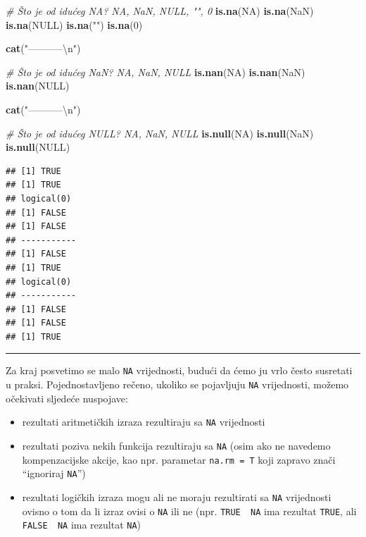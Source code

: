 \documentclass[]{book}
\newenvironment{Shaded}{\begin{snugshade}}{\end{snugshade}}
\newcommand{\KeywordTok}[1]{\textcolor[rgb]{0.13,0.29,0.53}{\textbf{#1}}}
\newcommand{\DecValTok}[1]{\textcolor[rgb]{0.00,0.00,0.81}{#1}}
\newcommand{\CharTok}[1]{\textcolor[rgb]{0.31,0.60,0.02}{#1}}
\newcommand{\StringTok}[1]{\textcolor[rgb]{0.31,0.60,0.02}{#1}}
\newcommand{\CommentTok}[1]{\textcolor[rgb]{0.56,0.35,0.01}{\textit{#1}}}
\newcommand{\OtherTok}[1]{\textcolor[rgb]{0.56,0.35,0.01}{#1}}
\newcommand{\NormalTok}[1]{#1}
\providecommand{\tightlist}{%
  \setlength{\itemsep}{0pt}\setlength{\parskip}{0pt}}
\theoremstyle{definition}
\theoremstyle{definition}
\theoremstyle{definition}
\theoremstyle{remark}
\begin{document}
\begin{Shaded}
\begin{Highlighting}[]
\CommentTok{# Što je od idućeg NA?      NA, NaN, NULL, "", 0}
\KeywordTok{is.na}\NormalTok{(}\OtherTok{NA}\NormalTok{)}
\KeywordTok{is.na}\NormalTok{(}\OtherTok{NaN}\NormalTok{)}
\KeywordTok{is.na}\NormalTok{(}\OtherTok{NULL}\NormalTok{)}
\KeywordTok{is.na}\NormalTok{(}\StringTok{""}\NormalTok{)}
\KeywordTok{is.na}\NormalTok{(}\DecValTok{0}\NormalTok{)}

\KeywordTok{cat}\NormalTok{(}\StringTok{"-----------}\CharTok{\textbackslash{}n}\StringTok{"}\NormalTok{)}

\CommentTok{# Što je od idućeg NaN?     NA, NaN, NULL}
\KeywordTok{is.nan}\NormalTok{(}\OtherTok{NA}\NormalTok{)}
\KeywordTok{is.nan}\NormalTok{(}\OtherTok{NaN}\NormalTok{)}
\KeywordTok{is.nan}\NormalTok{(}\OtherTok{NULL}\NormalTok{)}

\KeywordTok{cat}\NormalTok{(}\StringTok{"-----------}\CharTok{\textbackslash{}n}\StringTok{"}\NormalTok{)}

\CommentTok{# Što je od idućeg NULL?    NA, NaN, NULL}
\KeywordTok{is.null}\NormalTok{(}\OtherTok{NA}\NormalTok{)}
\KeywordTok{is.null}\NormalTok{(}\OtherTok{NaN}\NormalTok{)}
\KeywordTok{is.null}\NormalTok{(}\OtherTok{NULL}\NormalTok{)}
\end{Highlighting}
\end{Shaded}

\begin{verbatim}
## [1] TRUE
## [1] TRUE
## logical(0)
## [1] FALSE
## [1] FALSE
## -----------
## [1] FALSE
## [1] TRUE
## logical(0)
## -----------
## [1] FALSE
## [1] FALSE
## [1] TRUE
\end{verbatim}

\begin{center}\rule{0.5\linewidth}{\linethickness}\end{center}

Za kraj posvetimo se malo \texttt{NA} vrijednosti, budući da ćemo ju
vrlo često susretati u praksi. Pojednostavljeno rečeno, ukoliko se
pojavljuju \texttt{NA} vrijednosti, možemo očekivati sljedeće nuspojave:

\begin{itemize}
\tightlist
\item
  rezultati aritmetičkih izraza rezultiraju sa \texttt{NA} vrijednosti
\item
  rezultati poziva nekih funkcija rezultiraju sa \texttt{NA} (osim ako
  ne navedemo kompenzacijske akcije, kao npr. parametar
  \texttt{na.rm\ =\ T} koji zapravo znači ``ignoriraj \texttt{NA}'')
\item
  rezultati logičkih izraza mogu ali ne moraju rezultirati sa
  \texttt{NA} vrijednosti ovisno o tom da li izraz ovisi o \texttt{NA}
  ili ne (npr. \texttt{TRUE\ \textbar{}\textbar{}\ NA} ima rezultat
  \texttt{TRUE}, ali \texttt{FALSE\ \textbar{}\textbar{}\ NA} ima
  rezultat \texttt{NA})
\end{itemize}
\end{document}
